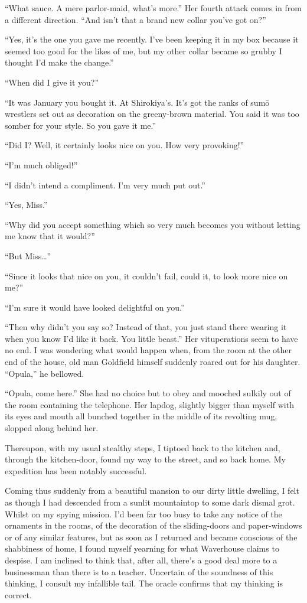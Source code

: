 \documentclass[12pt, openright]{book}
\begin{document}
``What sauce. A mere parlor-maid, what's more.'' Her fourth attack comes
in from a different direction. ``And isn't that a brand new collar
you've got on?''

``Yes, it's the one you gave me recently. I've been keeping it in my box
because it seemed too good for the likes of me, but my other collar
became so grubby I thought I'd make the change.''

``When did I give it you?''

``It was January you bought it. At Shirokiya's. It's got the ranks of
sumō wrestlers set out as decoration on the greeny-brown material. You
said it was too somber for your style. So you gave it me.''

``Did I? Well, it certainly looks nice on you. How very provoking!''

``I'm much obliged!''

``I didn't intend a compliment. I'm very much put out.''

``Yes, Miss.''

``Why did you accept something which so very much becomes you without
letting me know that it would?''

``But Miss\ldots{}''

``Since it looks that nice on you, it couldn't fail, could it, to look
more nice on me?''

``I'm sure it would have looked delightful on you.''

``Then why didn't you say so? Instead of that, you just stand there
wearing it when you know I'd like it back. You little beast.'' Her
vituperations seem to have no end. I was wondering what would happen
when, from the room at the other end of the house, old man Goldfield
himself suddenly roared out for his daughter. ``Opula,'' he bellowed.

``Opula, come here.'' She had no choice but to obey and mooched sulkily
out of the room containing the telephone. Her lapdog, slightly bigger
than myself with its eyes and mouth all bunched together in the middle
of its revolting mug, slopped along behind her.

Thereupon, with my usual stealthy steps, I tiptoed back to the kitchen
and, through the kitchen-door, found my way to the street, and so back
home. My expedition has been notably successful.

Coming thus suddenly from a beautiful mansion to our dirty little
dwelling, I felt as though I had descended from a sunlit mountaintop to
some dark dismal grot. Whilst on my spying mission. I'd been far too
busy to take any notice of the ornaments in the rooms, of the decoration
of the sliding-doors and paper-windows or of any similar features, but
as soon as I returned and became conscious of the shabbiness of home, I
found myself yearning for what Waverhouse claims to despise. I am
inclined to think that, after all, there's a good deal more to a
businessman than there is to a teacher. Uncertain of the soundness of
this thinking, I consult my infallible tail. The oracle confirms that my
thinking is correct.
\end{document}
